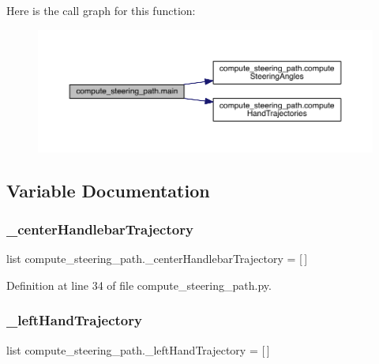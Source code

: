 Here is the call graph for this function\+:\nopagebreak
\begin{figure}[H]
\begin{center}
\leavevmode
\includegraphics[width=350pt]{namespacecompute__steering__path_a595f095c82464b1e9ee202094f3988f6_cgraph}
\end{center}
\end{figure}


\subsection{Variable Documentation}
\mbox{\label{namespacecompute__steering__path_af3ecc414817ba429eb9b24c06e91efe6}} 
\subsubsection{\texorpdfstring{\_centerHandlebarTrajectory}{\_centerHandlebarTrajectory}}
{\footnotesize\ttfamily list compute\+\_\+steering\+\_\+path.\+\_\+center\+Handlebar\+Trajectory = \mbox{[}$\,$\mbox{]}\hspace{0.3cm}{\ttfamily [private]}}



Definition at line 34 of file compute\+\_\+steering\+\_\+path.\+py.

\mbox{\label{namespacecompute__steering__path_a20e0028691b419d3f7721c0acd4a06ac}} 
\subsubsection{\texorpdfstring{\_leftHandTrajectory}{\_leftHandTrajectory}}
{\footnotesize\ttfamily list compute\+\_\+steering\+\_\+path.\+\_\+left\+Hand\+Trajectory = \mbox{[}$\,$\mbox{]}\hspace{0.3cm}{\ttfamily [private]}}



